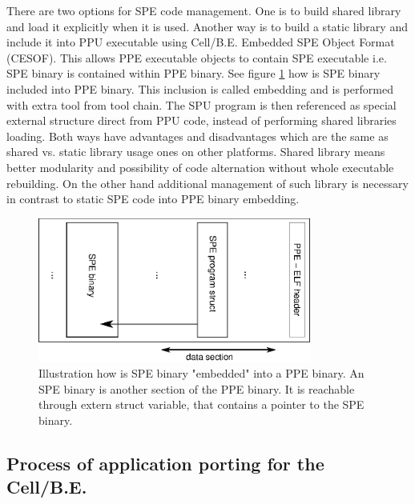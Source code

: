 \par
There are two options for SPE code management.
One is to build shared library and load it explicitly when it is used.
Another way is to build a static library and include it into PPU executable using \mbox{Cell/B.E.} Embedded SPE Object Format (CESOF).
This allows PPE executable objects to contain SPE executable i.e. SPE binary is contained within PPE binary.
See figure \ref{fg:SPEEmbedding} how is SPE binary included into PPE binary.
This inclusion is called embedding and is performed with extra tool from tool chain.
The SPU program is then referenced as special external structure direct from PPU code, instead of performing shared libraries loading.
Both ways have advantages and disadvantages which are the same as shared vs. static library usage ones on other platforms.
Shared library means better modularity and possibility of code alternation without whole executable rebuilding.
On the other hand additional management of such library is necessary in contrast to static SPE code into PPE binary embedding.


\begin{figure}
    \centering
    \includegraphics[width=0.8\textwidth]{data/SPEEmbedding}
    \caption[SPE binary embedding]{Illustration how is SPE binary "embedded" into a PPE binary.
An SPE binary is another section of the PPE binary.
It is reachable through extern struct variable, that contains a pointer to the SPE binary.}
    \label{fg:SPEEmbedding}
\end{figure}



\subsection {Process of application porting for the \mbox{Cell/B.E.}}
\label{sect:portingProcess}

